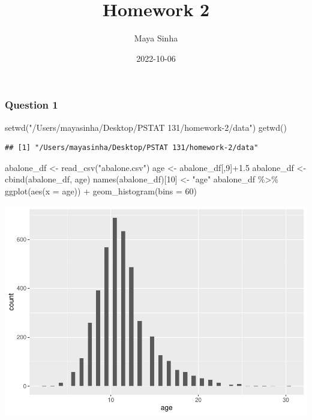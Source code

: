 \documentclass[
]{article}
\title{Homework 2}
\author{Maya Sinha}
\date{2022-10-06}
\newenvironment{Shaded}{\begin{snugshade}}{\end{snugshade}}
\newcommand{\AttributeTok}[1]{\textcolor[rgb]{0.77,0.63,0.00}{#1}}
\newcommand{\DecValTok}[1]{\textcolor[rgb]{0.00,0.00,0.81}{#1}}
\newcommand{\FloatTok}[1]{\textcolor[rgb]{0.00,0.00,0.81}{#1}}
\newcommand{\FunctionTok}[1]{\textcolor[rgb]{0.00,0.00,0.00}{#1}}
\newcommand{\NormalTok}[1]{#1}
\newcommand{\OtherTok}[1]{\textcolor[rgb]{0.56,0.35,0.01}{#1}}
\newcommand{\SpecialCharTok}[1]{\textcolor[rgb]{0.00,0.00,0.00}{#1}}
\newcommand{\StringTok}[1]{\textcolor[rgb]{0.31,0.60,0.02}{#1}}
\begin{document}
\maketitle

\hypertarget{question-1}{%
\subsubsection{Question 1}\label{question-1}}

\begin{Shaded}
\begin{Highlighting}[]
\FunctionTok{setwd}\NormalTok{(}\StringTok{"/Users/mayasinha/Desktop/PSTAT 131/homework{-}2/data"}\NormalTok{) }
\FunctionTok{getwd}\NormalTok{()}
\end{Highlighting}
\end{Shaded}

\begin{verbatim}
## [1] "/Users/mayasinha/Desktop/PSTAT 131/homework-2/data"
\end{verbatim}

\begin{Shaded}
\begin{Highlighting}[]
\NormalTok{abalone\_df }\OtherTok{\textless{}{-}} \FunctionTok{read\_csv}\NormalTok{(}\StringTok{"abalone.csv"}\NormalTok{)}
\NormalTok{age }\OtherTok{\textless{}{-}}\NormalTok{ abalone\_df[,}\DecValTok{9}\NormalTok{]}\SpecialCharTok{+}\FloatTok{1.5}
\NormalTok{abalone\_df }\OtherTok{\textless{}{-}} \FunctionTok{cbind}\NormalTok{(abalone\_df, age)}
\FunctionTok{names}\NormalTok{(abalone\_df)[}\DecValTok{10}\NormalTok{] }\OtherTok{\textless{}{-}} \StringTok{"age"}
\NormalTok{abalone\_df }\SpecialCharTok{\%\textgreater{}\%} 
  \FunctionTok{ggplot}\NormalTok{(}\FunctionTok{aes}\NormalTok{(}\AttributeTok{x =}\NormalTok{ age)) }\SpecialCharTok{+}
  \FunctionTok{geom\_histogram}\NormalTok{(}\AttributeTok{bins =} \DecValTok{60}\NormalTok{) }
\end{Highlighting}
\end{Shaded}

\includegraphics{Homework-2_files/figure-latex/unnamed-chunk-2-1.pdf}
\end{document}
